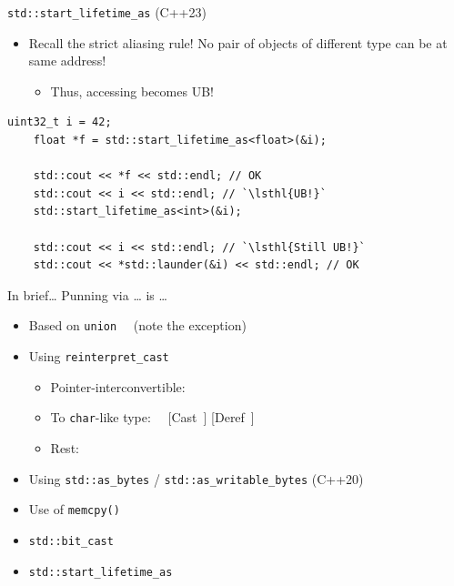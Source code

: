 \begin{frame}[fragile]{\texttt{std::start\_lifetime\_as} (C++23)}
  \begin{itemize}
  \item Recall the strict aliasing rule! No pair of objects of different type can be at same address!
    \begin{itemize}
    \item Thus, accessing  becomes UB!
    \end{itemize}
  \end{itemize}

  \pause
  \begin{lstlisting}[style=c++]
    uint32_t i = 42;
    float *f = std::start_lifetime_as<float>(&i);

    std::cout << *f << std::endl; // OK
    std::cout << i << std::endl; // `\lsthl{UB!}`
    std::start_lifetime_as<int>(&i);

    std::cout << i << std::endl; // `\lsthl{Still UB!}`
    std::cout << *std::launder(&i) << std::endl; // OK
  \end{lstlisting}
\end{frame}

\begin{frame}{In brief\ldots}
  Punning via \ldots{} is \ldots{}
  \begin{itemize}
  \item Based on \texttt{union} ~~\NotOK (note the exception)

  \item Using \texttt{reinterpret\_cast}
    \begin{itemize}
    \item Pointer-interconvertible: ~~\OK
    \item To \texttt{char}-like type: ~~[Cast~\OK] [Deref~\question]
    \item \alert{Rest:} ~~\NotOK
    \end{itemize}

  \item Using \texttt{std::as\_bytes} / \texttt{std::as\_writable\_bytes} (C++20) ~~\OK~\question

  \item Use of \texttt{memcpy()} ~~\OK

  \item \texttt{std::bit\_cast} ~~\OK

  \item \texttt{std::start\_lifetime\_as} ~~\OK
  \end{itemize}
\end{frame}

